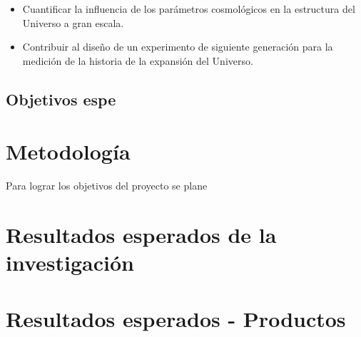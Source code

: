 \documentclass[spanish,notitlepage,letterpaper,11pt]{article} %
\begin{document}
\begin{itemize}
\item  Cuantificar la influencia de los par\'ametros cosmol\'ogicos en la
  estructura del Universo a gran escala.
\item Contribuir al dise\~no de un experimento de siguiente
  generaci\'on para la medici\'on de la historia de la expansi\'on del
  Universo. 
\end{itemize}

\subsection{Objetivos espe}



\section{Metodolog\'ia}

Para lograr los objetivos del proyecto se plane

\section{Resultados esperados de la investigaci\'on}

\section{Resultados esperados - Productos}

 
\end{document}
